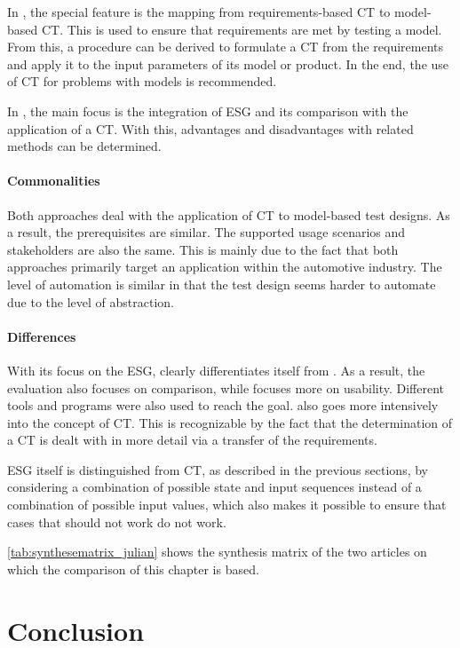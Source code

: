 In \cite{Conrad2005}, the special feature is the mapping from requirements-based CT to model-based CT. This is used to ensure that requirements are met by testing a model. From this, a procedure can be derived to formulate a CT from the requirements and apply it to the input parameters of its model or product. In the end, the use of CT for problems with models is recommended. 

In \cite{Belli2009}, the main focus is the integration of ESG and its comparison with the application of a CT. With this, advantages and disadvantages with related methods can be determined.

\paragraph{Commonalities}

Both approaches deal with the application of CT to model-based test designs. As a result, the prerequisites are similar. The supported usage scenarios and stakeholders are also the same. This is mainly due to the fact that both approaches primarily target an application within the automotive industry. The level of automation is similar in that the test design seems harder to automate due to the level of abstraction.

\paragraph{Differences}

With its focus on the ESG, \cite{Belli2009} clearly differentiates itself from \cite{Conrad2005}. As a result, the evaluation also focuses on comparison, while \cite{Conrad2005} focuses more on usability. Different tools and programs were also used to reach the goal. \cite{Conrad2005} also goes more intensively into the concept of CT. This is recognizable by the fact that the determination of a CT is dealt with in more detail via a transfer of the requirements.

ESG itself is distinguished from CT, as described in the previous sections, by considering a combination of possible state and input sequences instead of a combination of possible input values, which also makes it possible to ensure that cases that should not work do not work.

\autoref{tab:synthesematrix_julian} shows the synthesis matrix of the two articles on which the comparison of this chapter is based. 

\section{Conclusion}
\label{Kap:Conclusion}

